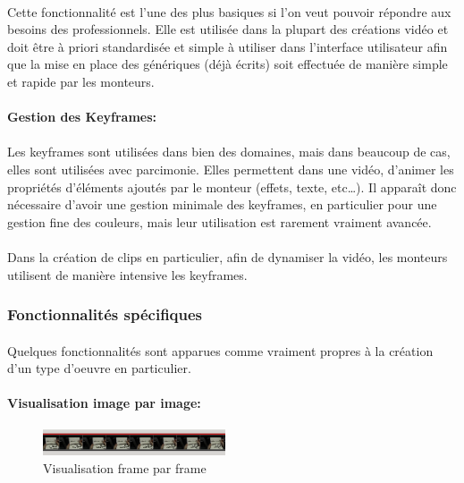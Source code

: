 \paragraph{}
Cette fonctionnalité est l'une des plus basiques si
l'on veut pouvoir répondre aux besoins des professionnels. Elle est utilisée
dans la plupart des créations vidéo et doit être à priori standardisée et
simple à utiliser dans l'interface utilisateur afin que la mise en place
des génériques (déjà écrits) soit effectuée de manière simple et rapide
par les monteurs.

\paragraph{Gestion des Keyframes:}
\paragraph{}

Les keyframes sont utilisées dans bien des domaines, mais dans beaucoup de cas, elles sont
utilisées avec parcimonie. Elles permettent dans une vidéo, d'animer les propriétés
d'éléments ajoutés par le monteur (effets, texte, etc\ldots). Il
apparaît donc nécessaire d'avoir une gestion minimale des keyframes,
en particulier pour une gestion fine des couleurs, mais leur utilisation est
rarement vraiment avancée.

\paragraph{}
Dans la création de clips en particulier, afin de dynamiser la vidéo,
les monteurs utilisent de manière intensive les keyframes.

\subsubsection{Fonctionnalités spécifiques}

\paragraph{}
Quelques fonctionnalités sont apparues comme vraiment propres à la création
d'un type d'oeuvre en particulier.

\paragraph{Visualisation image par image:}
\begin{figure}
    \begin{center}
      \includegraphics[width=0.48\textwidth]{images/frameByFrame}
    \end{center} \caption{Visualisation frame par frame} \label{Yes}
\end{figure}

